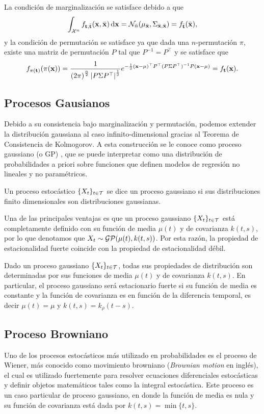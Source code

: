 La condición de marginalización se satisface debido a que
\[ \int_{\mathcal{X}^n} f_{\mathbf{t}, \bar{\mathbf{t}}} (\mathbf{x}, \bar{\mathbf{x}}) \dd{\mathbf{x}} = \mathcal{N}_{\bar{n}} (\mu_{\bar{\mathbf{x}}}, \Sigma_{\bar{\mathbf{x}},\bar{\mathbf{x}}}) = f_{\bar{\mathbf{t}}} (\bar{\mathbf{x}}),\]
y la condición de permutación se satisface ya que dada una \(n\)-permutación \(\pi\), existe una matriz de permutación \(P\) tal que \(P^{-1} = P^\top\) y se satisface que
\[f_{\pi(\mathbf{t})}(\pi(\mathbf{x})) = \frac{1}{\left(2\pi\right)^{\frac{n}{2}} \left\vert P \Sigma P^\top \right\vert^{\frac{1}{2}}} e^{-\frac{1}{2} (\mathbf{x} - \mu)^\top P^\top (P\Sigma P^{\top})^{-1} P (\mathbf{x} - \mu)} = f_{\mathbf{t}}(\mathbf{x}).
\]

\subsection{Procesos Gausianos}

Debido a su consistencia bajo marginalización y permutación, podemos extender la distribución gaussiana al caso infinito-dimensional gracias al Teorema de Consistencia de Kolmogorov. A esta construcción se le conoce como proceso gaussiano (o GP) \cite{rasmussen06}, que se puede interpretar como una distribución de probabilidades a priori sobre funciones que definen modelos de regresión no lineales y no paramétricos.

\begin{definition}
	Un proceso estocástico \(\{X_t\}_{t \in \mathcal{T}}\) se dice un proceso gaussiano si sus distribuciones finito dimensionales son distribuciones gaussianas.
\end{definition}

Una de las principales ventajas es que un proceso gaussiano \(\{X_t\}_{t \in \mathcal{T}}\) está completamente definido con su función de media \(\mu(t)\) y de covarianza \(k(t, s)\), por lo que denotamos que \(X_t \sim \operatorname{\mathcal{GP}}(\mu(t), k(t, s))\). Por esta razón, la propiedad de estacionalidad fuerte coincide con la propiedad de estacionalidad débil.

\begin{proposition}
	Dado un proceso gaussiano \(\{X_t\}_{t \in \mathcal{T}}\), todas sus propiedades de distribución son determinadas por sus funciones de media \(\mu(t)\) y de covarianza \(k(t, s)\). En particular, el proceso gaussiano será estacionario fuerte si su función de media es constante y la función de covarianza es en función de la diferencia temporal, es decir \(\mu(t) = \mu\) y \(k(t, s) = k_\rho(t - s)\).
\end{proposition}

\subsection{Proceso Browniano}
Uno de los procesos estocásticos más utilizado en probabilidades es el proceso de Wiener, más conocido como movimiento browniano (\emph{Brownian motion} en inglés), el cual es utilizado fuertemente para resolver ecuaciones diferenciales estocásticas y definir objetos matemáticos tales como la integral estocástica. Este proceso es un caso particular de proceso gaussiano, en donde la función de media es nula y su función de covarianza está dada por \(k(t, s) = \min\{t, s\}\).

